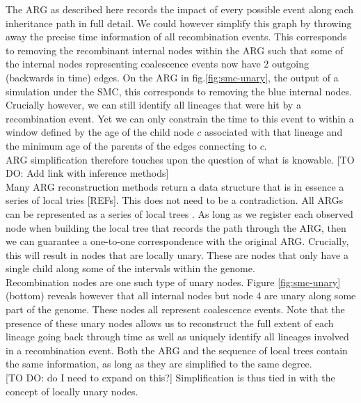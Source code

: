 \documentclass{article}
\begin{document}
The ARG as described here records the impact of every possible event along each 
inheritance path in full detail. We could however simplify this graph by 
throwing away the precise time information of all recombination events. This 
corresponds to removing the recombinant internal nodes within the ARG such that some of 
the internal nodes representing coalescence events now have 2 outgoing (backwards in time) 
edges. On the ARG in fig.\ref{fig:smc-unary}, the output of a simulation under the SMC, 
this corresponds to removing the blue internal nodes. Crucially however, 
we can still identify all lineages that were hit by a recombination event. Yet we 
can only constrain the time to this event to within a window defined by the age of the 
child node $c$ associated with that lineage and the minimum age of the parents of the 
edges connecting to $c$.\\

ARG simplification therefore touches upon the question of what is knowable.  
[TO DO: Add link with inference methods]\\

Many ARG reconstruction methods return a data structure that 
is in essence a series of local tries [REFs]. This does not need to be a contradiction. 
All ARGs can be represented as a series of local trees \citep{wong-2023}.
As long as we register each observed node when building the local tree that 
records the path through the ARG, then we can guarantee a one-to-one correspondence 
with the original ARG. Crucially, this will result in nodes that 
are locally unary. These are nodes that only have a single child along some of the 
intervals within the genome.\\

Recombination nodes are one such type of unary nodes. Figure \ref{fig:smc-unary} (bottom)
reveals however that all internal nodes but node 4 are unary along some part of 
the genome. These nodes all represent coalescence events. Note that the presence of these 
unary nodes allows us to reconstruct the full extent 
of each lineage going back through time as well as uniquely identify all lineages involved 
in a recombination event. Both the ARG and the sequence of 
local trees contain the same information, as long as they are simplified to the 
same degree.\\

[TO DO: do I need to expand on this?] Simplification is thus tied in with the concept of locally unary nodes.\\
\end{document}

